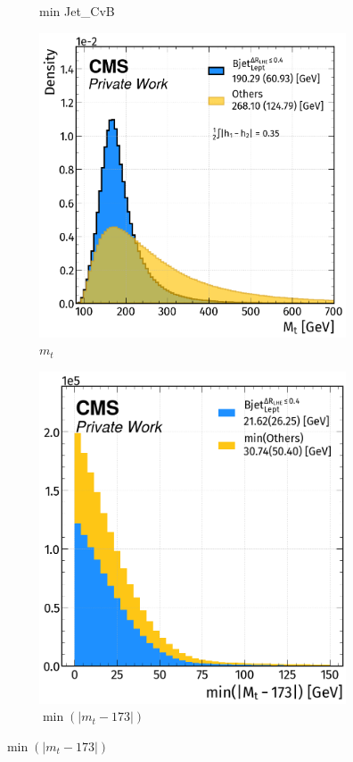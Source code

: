 \begin{figure}[H]
\begin{subfigure}{0.47\linewidth}
        \caption{min Jet\_CvB}
    \end{subfigure} 
    \hfill
    \begin{subfigure}{0.513\linewidth}
        \centering
        \includegraphics[width=1\linewidth]{fig//chap08-kin_reco/Tmass.png}
        \caption{$m_t$}
    \end{subfigure}
    \hfill
    \begin{subfigure}{0.47\linewidth}  
        \centering
        \includegraphics[width=1\linewidth]{fig//chap08-kin_reco/min_Tmass.png}
        \caption{$\min(|m_t-173|)$}
    \end{subfigure}  
\end{figure}





